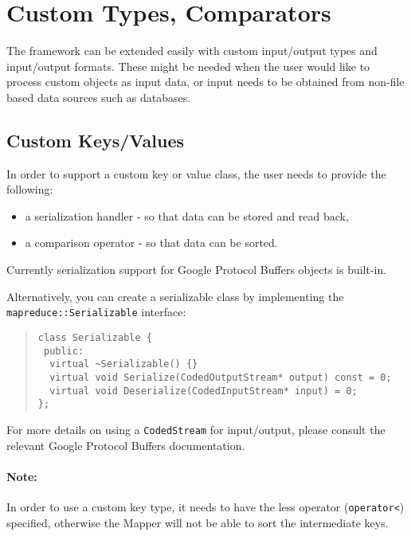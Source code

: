 \documentclass{article}
\begin{document}
\section{Custom Types, Comparators}

The framework can be extended easily with custom input/output types and input/output formats. These might be needed when the user would like to process custom objects as input data, or input needs to be obtained from non-file based data sources such as databases.

\subsection{Custom Keys/Values}

In order to support a custom key or value class, the user needs to provide the following:
\begin{itemize}
\item a serialization handler - so that data can be stored and read back,
\item a comparison operator - so that data can be sorted.
\end{itemize}

Currently serialization support for Google Protocol Buffers \cite{protobuf} objects is built-in.

Alternatively, you can create a serializable class by implementing the \texttt{mapreduce::Serializable} interface:
\begin{quote}
\begin{verbatim}
class Serializable {
 public:
  virtual ~Serializable() {}
  virtual void Serialize(CodedOutputStream* output) const = 0;
  virtual void Deserialize(CodedInputStream* input) = 0;
};
\end{verbatim}
\end{quote}

For more details on using a \texttt{CodedStream} for input/output, please consult the relevant Google Protocol Buffers \cite{protobuf} documentation.

\paragraph{Note:}
In order to use a custom key type, it needs to have the less operator (\texttt{operator<}) specified, otherwise the Mapper will not be able to sort the intermediate keys.

%
\end{document}
